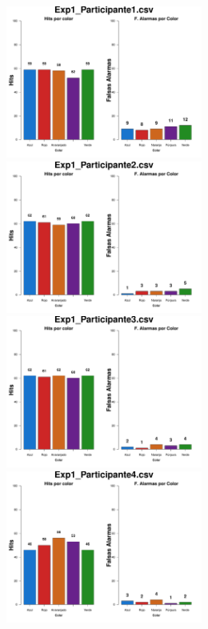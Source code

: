 \documentclass[a4paper ]{article}
\begin{document}
\begin{figure}[th]
\centering
\includegraphics[width=9cm, height=5cm]{Figures/Color_Exp1_P1} \includegraphics[width=9cm, height=5cm]{Figures/Color_Exp1_P2} 
\includegraphics[width=9cm, height=5cm]{Figures/Color_Exp1_P3} \includegraphics[width=9cm, height=5cm]{Figures/Color_Exp1_P4} 

\end{figure}
\end{document}

